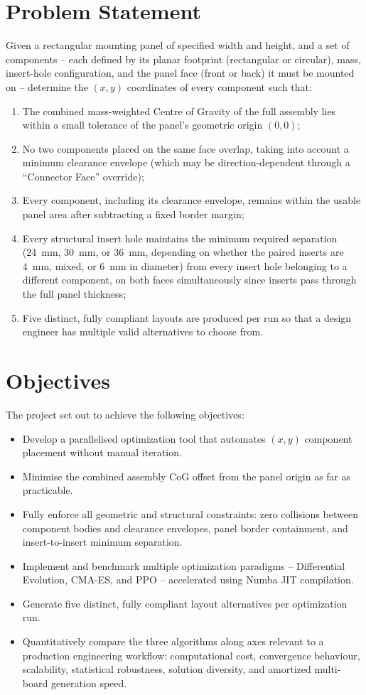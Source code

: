 \documentclass[11pt,a4paper,oneside]{report}
\begin{document}
\section{Problem Statement}
Given a rectangular mounting panel of specified width and height, and a set of components -- each defined by its planar footprint (rectangular or circular), mass, insert-hole configuration, and the panel face (front or back) it must be mounted on -- determine the $(x, y)$ coordinates of every component such that:
\begin{enumerate}[label=(\roman*)]
    \item The combined mass-weighted Centre of Gravity of the full assembly lies within a small tolerance of the panel's geometric origin $(0, 0)$;
    \item No two components placed on the same face overlap, taking into account a minimum clearance envelope (which may be direction-dependent through a ``Connector Face'' override);
    \item Every component, including its clearance envelope, remains within the usable panel area after subtracting a fixed border margin;
    \item Every structural insert hole maintains the minimum required separation (24~mm, 30~mm, or 36~mm, depending on whether the paired inserts are 4~mm, mixed, or 6~mm in diameter) from every insert hole belonging to a different component, on both faces simultaneously since inserts pass through the full panel thickness;
    \item Five distinct, fully compliant layouts are produced per run so that a design engineer has multiple valid alternatives to choose from.
\end{enumerate}

\section{Objectives}
The project set out to achieve the following objectives:
\begin{itemize}
    \item Develop a parallelised optimization tool that automates $(x, y)$ component placement without manual iteration.
    \item Minimise the combined assembly CoG offset from the panel origin as far as practicable.
    \item Fully enforce all geometric and structural constraints: zero collisions between component bodies and clearance envelopes, panel border containment, and insert-to-insert minimum separation.
    \item Implement and benchmark multiple optimization paradigms -- Differential Evolution, CMA-ES, and PPO -- accelerated using Numba JIT compilation.
    \item Generate five distinct, fully compliant layout alternatives per optimization run.
    \item Quantitatively compare the three algorithms along axes relevant to a production engineering workflow: computational cost, convergence behaviour, scalability, statistical robustness, solution diversity, and amortized multi-board generation speed.
\end{itemize}
\end{document}
